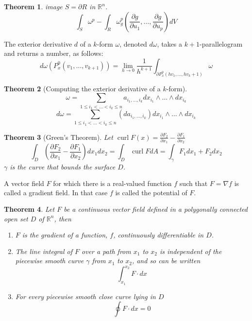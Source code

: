 \documentclass[letter]{article}
\newcommand{\R}{\mathbb{R}}
\newcommand{\curl}{\operatorname{curl}}
\newtheorem{theorem}{Theorem}[section]
\newenvironment{definition}[1][Definition]{\begin{trivlist}
\item[\hskip \labelsep {\bfseries #1}]}{\end{trivlist}}
\begin{document}
\begin{theorem}
image $S = \partial R$ in $\R^n$.
\[\int_S \omega^p - \int_R \omega^p_g (\frac{\partial g}{\partial u_1}, \ldots, \frac{\partial g}{\partial u_p}) dV\]
\end{theorem}

\begin{definition}[Exterior derivatives]
The exterior derivative $d$ of a $k$-form $\omega$, denoted $d\omega$, takes a $k+1$-parallelogram and returns a number, as follows:
\[d\omega(P_x^0(v_1,\ldots,v_{k+1})) = \lim_{h\to 0}\frac{1}{h^{k+1}} \int_{\partial P_x^0(hv_1,\ldots,hv_k+1)}\omega\]
\end{definition}

\begin{theorem}[Computing the exterior derivative of a $k$-form]
\[\omega = \sum_{1\leq i_1<\ldots< i_k\leq n} a_{i_1,\ldots,i_k} dx_{i_1}\wedge \ldots \wedge dx_{i_k} \]
\[
d\omega = \sum_{1\leq i_1<\ldots< i_k\leq n} (da_{i_1,\ldots,i_k}) dx_{i_1}\wedge \ldots \wedge dx_{i_k} 
\]
\end{theorem}

\begin{theorem}[Green's Theorem]
Let $\curl F(x) = \frac{\partial F_2}{\partial x_1} - \frac{\partial F_1}{\partial x_2}$
\[
\int_D(\frac{\partial F_2}{\partial x_1} - \frac{\partial F_1}{\partial x_2}) dx_1 dx_2 = \int_D \curl F dA = \int_\gamma F_1dx_1+F_2 dx_2
\]
$\gamma$ is the curve that bounds the surface $D$.

\end{theorem}

\begin{definition}
A vector field $F$ for which there is a real-valued function $f$ such that $F = \nabla f$ is called a gradient field. In that case $f$ is called the potential of $F$.
\end{definition}

\begin{theorem}
Let $F$ be a continuous vector field defined in a polygonally connected open set $D$ of $\R^n$, then
\begin{enumerate}
\item $F$ is the gradient of a function, $f$, continuously differentiable in $D$.
\item The line integral of $F$ over a path from $x_1$ to $x_2$ is independent of the piecewise smooth curve $\gamma$ from $x_1$ to $x_2$, and so can be written
\[
\int_{x_1}^{x_2} F \cdot dx
\]
\item For every piecewise smooth close curve lying in $D$
\[
\oint F\cdot dx = 0
\]
\end{enumerate}
\end{theorem}
\end{document}
